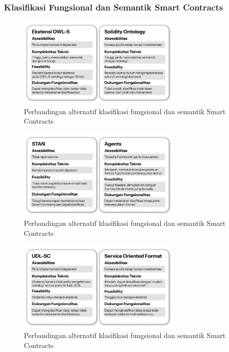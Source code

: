 \subsubsection{Klasifikasi Fungsional dan Semantik Smart Contracts}

\begin{figure}[ht]
	\centering
	\includegraphics[width=0.7\textwidth]{resources/chapter-3/klasifikasi - 1.png}
	\caption{Perbandingan alternatif klasifikasi fungsional dan semantik Smart Contracts}
	\label{image:klasifikasi-1}
\end{figure}

\begin{figure}[ht]
	\centering
	\includegraphics[width=0.7\textwidth]{resources/chapter-3/klasifikasi - 2.png}
	\caption{Perbandingan alternatif klasifikasi fungsional dan semantik Smart Contracts}
	\label{image:klasifikasi-2}
\end{figure}

\begin{figure}[ht]
	\centering
	\includegraphics[width=0.7\textwidth]{resources/chapter-3/klasifikasi - 3.png}
	\caption{Perbandingan alternatif klasifikasi fungsional dan semantik Smart Contracts}
	\label{image:klasifikasi-3}
\end{figure}

